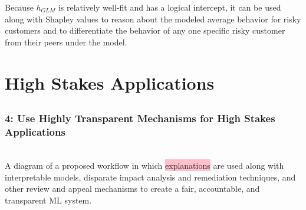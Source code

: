 \documentclass[11pt,aspectratio=169,hyperref={colorlinks}]{beamer}
\begin{document}
\begin{frame}[t, label={lime}]
	\scriptsize{Because $h_{GLM}$ is relatively well-fit and has a logical intercept, it can be used along with Shapley values to reason about the modeled average behavior for risky customers and to differentiate the behavior of any one specific risky customer from their peers under the model.}

	\end{frame}


	\section{High Stakes Applications}

	\subsection*{} %

	\begin{frame}
	
		\frametitle{4: Use Highly Transparent Mechanisms for \textbf{High Stakes Applications}}
		\vspace{2pt}
		\\
		\vspace{5pt}
		\scriptsize{A diagram of a proposed workflow in which \colorbox{pink}{explanations} are used along with interpretable models, disparate impact analysis and remediation techniques, and other review and appeal mechanisms to create a fair, accountable, and transparent ML system.}
	
	\end{frame}
\end{document}
